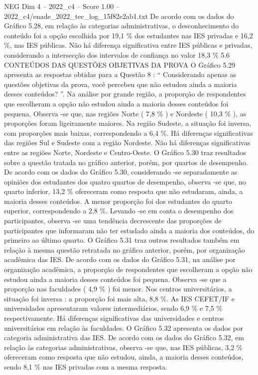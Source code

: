 \begin{textsample}{NEG Dim 4 – 2022\_c4 – Score 1.00 – 2022\_c4/enade\_2022\_tec\_log\_15f82e2ab1.txt}
De acordo com os dados do Gráfico 5.28, em relação às categorias administrativas, o desconhecimento do conteúdo foi a opção escolhida por 19,1 \% dos estudantes nas IES privadas e 16,2 \%, nas IES públicas.
Não há diferença significativa entre IES públicas e privadas, considerando a intersecção dos intervalos de confiança no valor 18,3 \% 5.6 CONTEÚDOS DAS QUESTÕES OBJETIVAS DA PROVA O Gráfico 5.29 apresenta as respostas obtidas para a Questão 8 : “ Considerando apenas as questões objetivas da prova, você percebeu que não estudou ainda a maioria desses conteúdos? ”.
Na análise por grande região, a proporção de respondentes que escolheram a opção não estudou ainda a maioria desses conteúdos foi pequena.
Observa -se que, nas regiões Norte ( 7,8 \% ) e Nordeste ( 10,3 \% ), as proporções foram ligeiramente maiores.
Na região Sudeste, a situação foi inversa, com proporções mais baixas, correspondendo a 6,4 \%.
Há diferenças significativas das regiões Sul e Sudeste com a região Nordeste.
Não há diferenças significativas entre as regiões Norte, Nordeste e Centro-Oeste.
O Gráfico 5.30 traz resultados sobre a questão tratada no gráfico anterior, porém, por quartos de desempenho.
De acordo com os dados do Gráfico 5.30, considerando -se separadamente as opiniões dos estudantes dos quatro quartos de desempenho, observa -se que, no quarto inferior, 13,2 \% ofereceram como resposta que não estudaram, ainda, a maioria desses conteúdos.
A menor proporção foi dos estudantes do quarto superior, correspondendo a 2,8 \%.
Levando -se em conta o desempenho dos participantes, observa -se uma tendência decrescente das proporções de participantes que informaram não ter estudado ainda a maioria dos conteúdos, do primeiro ao último quarto.
O Gráfico 5.31 traz outros resultados também em relação à mesma questão retratada no gráfico anterior, porém, por organização acadêmica das IES.
De acordo com os dados do Gráfico 5.31, na análise por organização acadêmica, a proporção de respondentes que escolheram a opção não estudou ainda a maioria desses conteúdos foi pequena.
Observa -se que a proporção nas faculdades ( 4,9 \% ) foi menor.
Nos centros universitários, a situação foi inversa : a proporção foi mais alta, 8,8 \%.
As IES CEFET/IF e universidades apresentaram valores intermediários, sendo 6,9 \% e 7,5 \% respectivamente.
Há diferenças significativas das universidades e centros universitários em relação às faculdades.
O Gráfico 5.32 apresenta os dados por categoria administrativa das IES.
De acordo com os dados do Gráfico 5.32, em relação às categorias administrativas, observa -se que, nas IES públicas, 3,2 \% ofereceram como resposta que não estudou, ainda, a maioria desses conteúdos, sendo 8,1 \% nas IES privadas com a mesma resposta.

\end{textsample}
